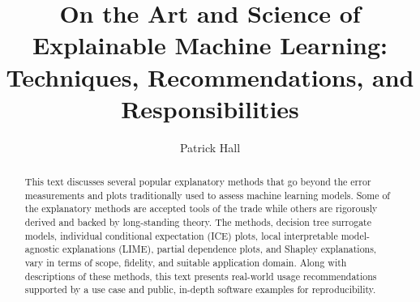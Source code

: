 \documentclass[sigconf]{acmart}
\begin{document}
%
\title[Explainable Machine Learning]{On the Art and Science of Explainable Machine Learning: \huge{Techniques, Recommendations, and Responsibilities}}

%
\author{Patrick Hall}

\renewcommand{\shortauthors}{Hall, Patrick}

%
\begin{abstract}
This text discusses several popular explanatory methods that go beyond the error measurements and plots traditionally used to assess machine learning models. Some of the explanatory methods are accepted tools of the trade while others are rigorously derived and backed by long-standing theory. The methods, decision tree surrogate models, individual conditional expectation (ICE) plots, local interpretable model-agnostic explanations (LIME), partial dependence plots, and Shapley explanations, vary in terms of scope, fidelity, and suitable application domain. Along with descriptions of these methods, this text presents real-world usage recommendations supported by a use case and public, in-depth software examples for reproducibility.
\end{abstract}

%
%


\end{document}

